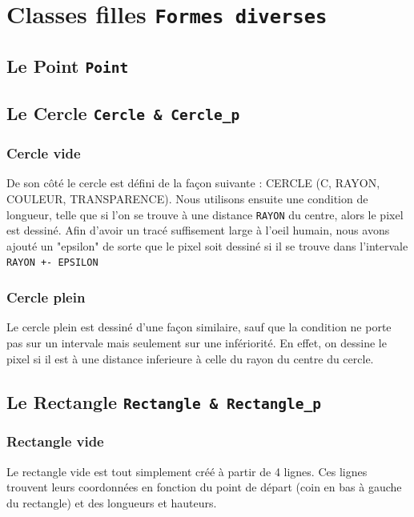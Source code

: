 \documentclass[11pt]{article}
\begin{document}
\clearpage
\section{Classes filles \texttt{Formes diverses}}

\subsection{Le Point \texttt{Point}}

\subsection{Le Cercle \texttt{Cercle \& Cercle\_p}}

\subsubsection{Cercle vide}

De son côté le cercle est défini de la façon suivante : CERCLE (C, RAYON, COULEUR, TRANSPARENCE). Nous utilisons ensuite une condition de longueur, telle que si l'on se trouve à une distance \texttt{RAYON} du centre, alors le pixel est dessiné. Afin d'avoir un tracé suffisement large à l'oeil humain, nous avons ajouté un "epsilon" de sorte que le pixel soit dessiné si il se trouve dans l'intervale \texttt{RAYON +- EPSILON}

\subsubsection{Cercle plein}

Le cercle plein est dessiné d'une façon similaire, sauf que la condition ne porte pas sur un intervale mais seulement sur une infériorité. En effet, on dessine le pixel si il est à une distance inferieure à celle du rayon du centre du cercle.

\subsection{Le Rectangle \texttt{Rectangle \& Rectangle\_p}}

\subsubsection{Rectangle vide}

Le rectangle vide est tout simplement créé à partir de 4 lignes. Ces lignes trouvent leurs coordonnées en fonction du point de départ (coin en bas à gauche du rectangle) et des longueurs et hauteurs.
\end{document}

